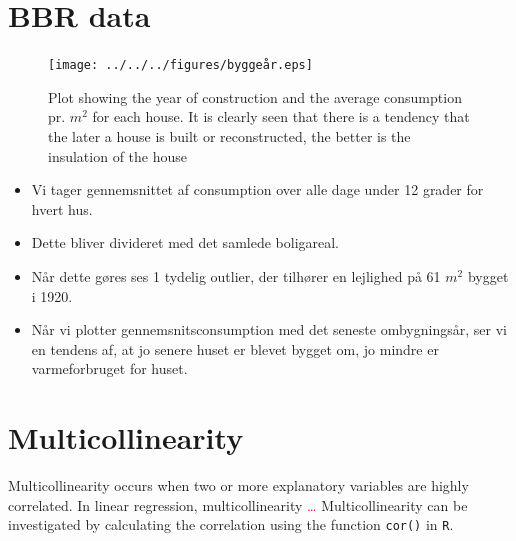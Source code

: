 \section{BBR data}

\begin{figure}
    \centering
    \texttt{[image: ../../../figures/byggeår.eps]}
    \caption{Plot showing the year of construction and the average consumption pr. $m^2$ for each house. It is clearly seen that there is a tendency that the later a house is built or reconstructed, the better is the insulation of the house}
    \label{fig: byggeår}
\end{figure}

\begin{itemize}
    \item Vi tager gennemsnittet af consumption over alle dage under 12 grader for hvert hus.
    \item Dette bliver divideret med det samlede boligareal.
    \item Når dette gøres ses 1 tydelig outlier, der tilhører en lejlighed på 61 $m^2$ bygget i 1920.
    \item Når vi plotter gennemsnitsconsumption med det seneste ombygningsår, ser vi en tendens af, at jo senere huset er blevet bygget om, jo mindre er varmeforbruget for huset.
\end{itemize}    

\section{Multicollinearity}
Multicollinearity occurs when two or more explanatory variables are highly correlated. In linear regression, multicollinearity \textcolor{red}{\dots} Multicollinearity can be investigated by calculating the correlation using the function \texttt{cor()} in \texttt{R}.\\

